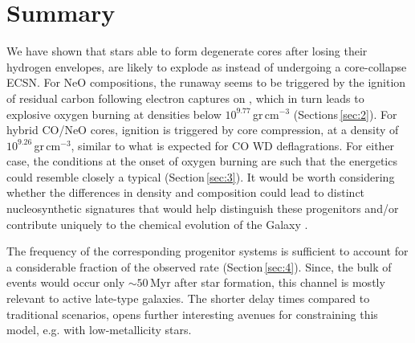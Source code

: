 \documentclass[../../main/thesis_msc.tex]{subfiles}
\begin{document}
\section{Summary}\label{sec:5}
We have shown that stars able to form degenerate \one cores after losing 
their hydrogen  envelopes, are likely to explode as \ias instead of undergoing a core-collapse ECSN. 
For NeO compositions, the runaway seems to be triggered by the ignition of 
residual carbon following electron captures on , which in turn 
leads to explosive oxygen burning at densities below $10^{9.77}$\,gr\,cm$^{-3}$ (Sections\,\ref{sec:2}). 
For hybrid CO/NeO cores, ignition is triggered by core compression, at a density of $10^{9.26}$\,gr\,cm$^{-3}$, similar to what is expected for CO WD deflagrations. For either case, the conditions at the onset of oxygen burning are such that the energetics  could resemble closely a typical \ias  (Section\,\ref{sec:3}). 
It would be worth considering whether the differences in density and 
composition could lead to distinct nucleosynthetic signatures that would help 
distinguish these progenitors and/or contribute uniquely to the chemical 
evolution of the Galaxy \citep[in analogy to ][for ECSNe]{Jones:2018ule}.



The frequency of the corresponding progenitor systems 
is sufficient to account for a considerable fraction of the observed \ia  rate  (Section\,\ref{sec:4}). Since, the bulk of events would occur only $\sim 50$\,Myr after star formation, this channel is mostly relevant to active late-type galaxies. The shorter delay times compared to traditional \ia scenarios, opens further interesting avenues for constraining this model, e.g. with low-metallicity stars.  
\end{document}

